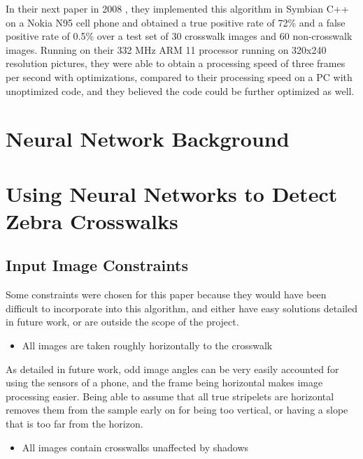 \documentclass[12pt]{ucthesis}
\begin{document}
In their next paper in 2008 \cite{ZebraPhone}, they implemented this algorithm in Symbian C++ on a Nokia  N95 cell phone and obtained a true positive rate of 72\% and a false positive rate of 0.5\% over a test set of 30 crosswalk images and 60 non-crosswalk images. Running on their 332 MHz ARM 11 processor running on 320x240 resolution pictures, they were able to obtain a processing speed of three frames per second with optimizations, compared to their processing speed on a PC with unoptimized code, and they believed the code could be further optimized as well. 

\chapter{Neural Network Background}

\chapter{Using Neural Networks to Detect Zebra Crosswalks}

\section{Input Image Constraints}
\label{Input Image Constraints}

Some constraints were chosen for this paper because they would have been difficult to incorporate into this algorithm, and either have easy solutions detailed in future work, or are outside the scope of the project. 

\begin{itemize}
\item All images are taken roughly horizontally to the crosswalk
\end{itemize}

As detailed in future work, odd image angles can be very easily accounted for using the sensors of a phone, and the frame being horizontal makes image processing easier. Being able to assume that all true stripelets are horizontal removes them from the sample early on for being too vertical, or having a slope that is too far from the horizon. 

\begin{itemize}
\item All images contain crosswalks unaffected by shadows
\end{itemize}
\end{document}
